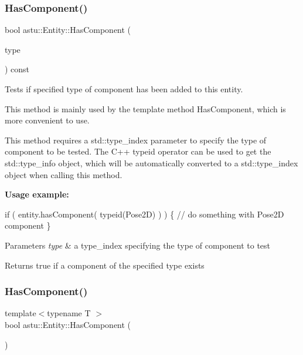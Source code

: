 \subsubsection{\texorpdfstring{Has\+Component()}{HasComponent()}\hspace{0.1cm}{\footnotesize\ttfamily [1/2]}}
{\footnotesize\ttfamily bool astu\+::\+Entity\+::\+Has\+Component (\begin{DoxyParamCaption}\item[{const std\+::type\+\_\+index \&}]{type }\end{DoxyParamCaption}) const}

Tests if specified type of component has been added to this entity.

This method is mainly used by the template method {\ttfamily Has\+Component}, which is more convenient to use.

This method requires a std\+::type\+\_\+index parameter to specify the type of component to be tested. The C++ {\ttfamily typeid} operator can be used to get the std\+::type\+\_\+info object, which will be automatically converted to a std\+::type\+\_\+index object when calling this method.

{\bfseries Usage example\+:} 
\begin{DoxyCode}
\textcolor{keywordflow}{if} ( entity.hasComponent( \textcolor{keyword}{typeid}(Pose2D) ) ) \{
    \textcolor{comment}{// do something with Pose2D component}
\}
\end{DoxyCode}



\begin{DoxyParams}{Parameters}
{\em type} & a type\+\_\+index specifying the type of component to test \\
\hline
\end{DoxyParams}
\begin{DoxyReturn}{Returns}
{\ttfamily true} if a component of the specified type exists 
\end{DoxyReturn}
\mbox{\label{classastu_1_1Entity_a80b75df1873d23f79f050bc6a178cd4c}} 
\subsubsection{\texorpdfstring{Has\+Component()}{HasComponent()}\hspace{0.1cm}{\footnotesize\ttfamily [2/2]}}
{\footnotesize\ttfamily template$<$typename T $>$ \\
bool astu\+::\+Entity\+::\+Has\+Component (\begin{DoxyParamCaption}{ }\end{DoxyParamCaption})\hspace{0.3cm}{\ttfamily [inline]}}

